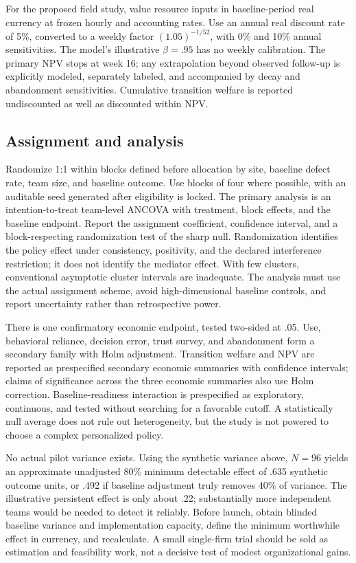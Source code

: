\documentclass[11pt]{article}
\begin{document}
For the proposed field study, value resource inputs in baseline-period real currency at frozen hourly and accounting rates. Use an annual real discount rate of 5\%, converted to a weekly factor $(1.05)^{-1/52}$, with 0\% and 10\% annual sensitivities. The model's illustrative $\beta=.95$ has no weekly calibration. The primary NPV stops at week 16; any extrapolation beyond observed follow-up is explicitly modeled, separately labeled, and accompanied by decay and abandonment sensitivities. Cumulative transition welfare is reported undiscounted as well as discounted within NPV.

\subsection{Assignment and analysis}
Randomize 1:1 within blocks defined before allocation by site, baseline defect rate, team size, and baseline outcome. Use blocks of four where possible, with an auditable seed generated after eligibility is locked. The primary analysis is an intention-to-treat team-level ANCOVA with treatment, block effects, and the baseline endpoint. Report the assignment coefficient, confidence interval, and a block-respecting randomization test of the sharp null. Randomization identifies the policy effect under consistency, positivity, and the declared interference restriction; it does not identify the mediator effect. With few clusters, conventional asymptotic cluster intervals are inadequate. The analysis must use the actual assignment scheme, avoid high-dimensional baseline controls, and report uncertainty rather than retrospective power.

There is one confirmatory economic endpoint, tested two-sided at .05. Use, behavioral reliance, decision error, trust survey, and abandonment form a secondary family with Holm adjustment. Transition welfare and NPV are reported as prespecified secondary economic summaries with confidence intervals; claims of significance across the three economic summaries also use Holm correction. Baseline-readiness interaction is prespecified as exploratory, continuous, and tested without searching for a favorable cutoff. A statistically null average does not rule out heterogeneity, but the study is not powered to choose a complex personalized policy.

No actual pilot variance exists. Using the synthetic variance above, $N=96$ yields an approximate unadjusted 80\% minimum detectable effect of .635 synthetic outcome units, or .492 if baseline adjustment truly removes 40\% of variance. The illustrative persistent effect is only about .22; substantially more independent teams would be needed to detect it reliably. Before launch, obtain blinded baseline variance and implementation capacity, define the minimum worthwhile effect in currency, and recalculate. A small single-firm trial should be sold as estimation and feasibility work, not a decisive test of modest organizational gains.
\end{document}
